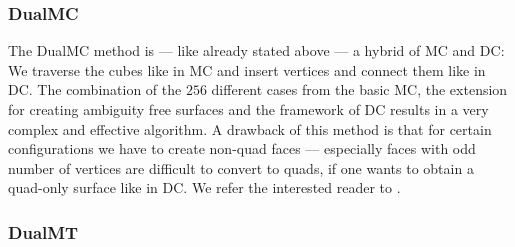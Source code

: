 \subsubsection{\acl{DualMC}}
The \acf{DualMC} method is --- like already stated above --- a hybrid of \ac{MC} and \ac{DC}: We traverse the cubes like in \ac{MC} and insert vertices and connect them like in \ac{DC}. The combination of the $256$ different cases from the basic \ac{MC}, the extension for creating ambiguity free surfaces and the framework of \ac{DC} results in a very complex and effective algorithm. A drawback of this method is that for certain configurations we have to create non-\ac{quad} faces --- especially faces with odd number of vertices are difficult to convert to \acp{quad}, if one wants to obtain a \ac{quad}-only surface like in \ac{DC}. We refer the interested reader to  \cite{Nielson2004, Zhang2012}.


\subsubsection{\acl{DualMT}}

